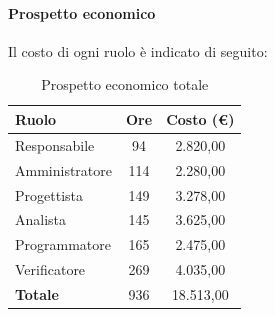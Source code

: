 \documentclass[../PianoDiProgetto.tex]{subfiles}
\begin{document}
			\newpage
			\paragraph{Prospetto economico}
			Il costo di ogni ruolo è indicato di seguito:
			\begin{table}[h]
				\centering
				\begin{tabular}{l * {2}{c}}
				\toprule
				\textbf{Ruolo} & \textbf{Ore} & \textbf{Costo (\euro{})} \\
				\midrule
				Responsabile & 94 & 2.820,00 \\
				Amministratore & 114 & 2.280,00 \\
				Progettista & 149 & 3.278,00 \\
				Analista & 145 & 3.625,00 \\		
				Programmatore & 165 & 2.475,00 \\		
				Verificatore & 269 & 4.035,00 \\				
				\midrule		
				\textbf{Totale} & 936 & 18.513,00 \\
				\bottomrule	
				\end{tabular}
				\caption{Prospetto economico totale}		
			\end{table}
			
\end{document}
